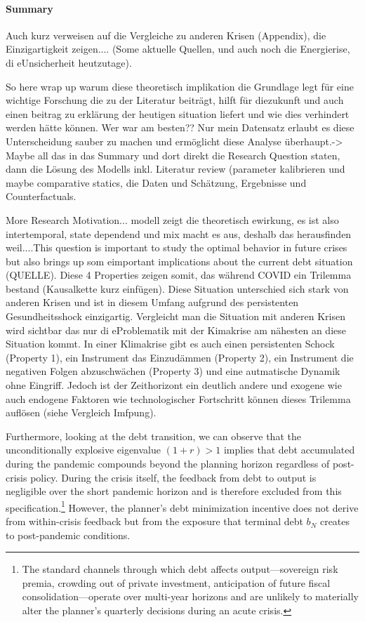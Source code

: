 \newpage

\paragraph{Summary}


Auch kurz verweisen auf die Vergleiche zu anderen Krisen (Appendix), die Einzigartigkeit zeigen....
(Some aktuelle Quellen, und auch noch die Energierise, di eUnsicherheit heutzutage).

So here wrap up warum diese theoretisch implikation die Grundlage legt für eine wichtige Forschung die zu der Literatur beiträgt, hilft für diezukunft und auch einen beitrag zu erklärung der heutigen situation liefert und wie dies verhindert werden hätte können. Wer war am besten?? Nur mein Datensatz erlaubt es diese Unterscheidung sauber zu machen und ermöglicht diese Analyse überhaupt.-> Maybe all das in das Summary und dort direkt die Research Question staten, dann die Lösung des Modells inkl. Literatur review (parameter kalibrieren und maybe comparative statics, die Daten und Schätzung, Ergebnisse und Counterfactuals.

More Research Motivation... modell zeigt die theoretisch ewirkung, es ist also intertemporal, state dependend und mix macht es aus, deshalb das herausfinden weil....This question is important to study the optimal behavior in future crises but also brings up som eimportant implications about the current debt situation (QUELLE). 
Diese 4 Properties zeigen somit, das während COVID ein Trilemma bestand (Kausalkette kurz einfügen).  Diese Situation unterschied sich stark von anderen Krisen und ist in diesem Umfang aufgrund des persistenten Gesundheitsshock einzigartig. Vergleicht man die Situation mit anderen Krisen wird sichtbar das nur di eProblematik mit der Kimakrise am nähesten an diese Situation kommt. In einer Klimakrise gibt es auch einen persistenten Schock (Property 1), ein Instrument das Einzudämmen (Property 2), ein Instrument die negativen Folgen abzuschwächen (Property 3) und eine autmatische Dynamik ohne Eingriff. Jedoch ist der Zeithorizont ein deutlich andere und exogene wie auch endogene Faktoren wie technologischer Fortschritt können dieses Trilemma auflösen (siehe Vergleich Imfpung).

Furthermore, looking at the debt transition, we can observe that the unconditionally explosive eigenvalue $(1+r) > 1$ implies that debt accumulated during the pandemic compounds beyond the planning horizon regardless of post-crisis policy. During the crisis itself, the feedback from debt to output is negligible over
the short pandemic horizon and is therefore excluded from this specification.\footnote{The standard channels through which debt affects output---sovereign
risk premia, crowding out of private investment, anticipation of future fiscal consolidation---operate over multi-year horizons and are unlikely to materially alter
the planner's quarterly decisions during an acute crisis.} 
However, the planner's debt minimization incentive does not derive from within-crisis feedback but from the exposure that terminal debt $b_N$ creates to post-pandemic conditions.

